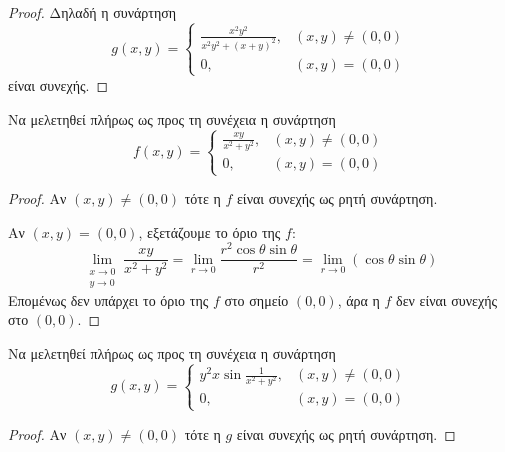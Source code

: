 \begin{examples}
\begin{enumerate}
\begin{enumerate}[i)]
\begin{proof}
                        Δηλαδή η συνάρτηση 
                        \[
                            g(x,y) = \begin{cases} \frac{x^{2}y^{2}}{x^{2}y^{2} + (x+y)^{2}}, & (x,y) \neq
                                (0,0) \\ 
                            0, & (x,y) = (0,0)\end{cases}  
                        \] είναι συνεχής.
                            \end{proof}
                    \end{enumerate}
                \item Να μελετηθεί πλήρως ως προς τη συνέχεια η συνάρτηση 
                    \[
                        f(x,y) = \begin{cases} \frac{xy}{x^{2}+y^{2}}, & (x,y) \neq (0,0) \\ 0, & (x,y) =
                        (0,0) \end{cases}  
                    \]
                    \begin{proof}
                    \item {}              
                        Αν $ (x,y) \neq (0,0) $ τότε η $f$ είναι συνεχής 
                        ως ρητή συνάρτηση.

                        Αν $ (x,y)=(0,0) $, εξετάζουμε το όριο της $f$: 
                        \[
                            \lim\limits_{\substack{x\to 0 \\y \to 0}} \frac{xy}{x^{2}+y^{2}} = \lim_{r \to 0}
                            \frac{r^{2} \cos{\theta} \sin{\theta} }{ r^{2}} = \lim_{r \to 0}(\cos{\theta}
                            \sin{\theta})
                        \] 
                        Επομένως δεν υπάρχει το όριο της $f$ στο σημείο $ (0,0) $, άρα η $f$ δεν είναι συνεχής
                        στο $ (0,0) $.
                    \end{proof}

                \item Να μελετηθεί πλήρως ως προς τη συνέχεια η συνάρτηση 
                    \[
                        g(x,y) = \begin{cases} y^{2}x \sin{\frac{1}{x^{2}+y^{2}}}, & (x,y) \neq (0,0) \\ 0, & (x,y)
                        = (0,0)\end{cases}  
                    \] 
                    \begin{proof}
                    \item {}
                        Αν $ (x,y) \neq (0,0) $ τότε η $g$ είναι συνεχής 
                        ως ρητή συνάρτηση.


\end{proof}
\end{enumerate}
\end{examples}
